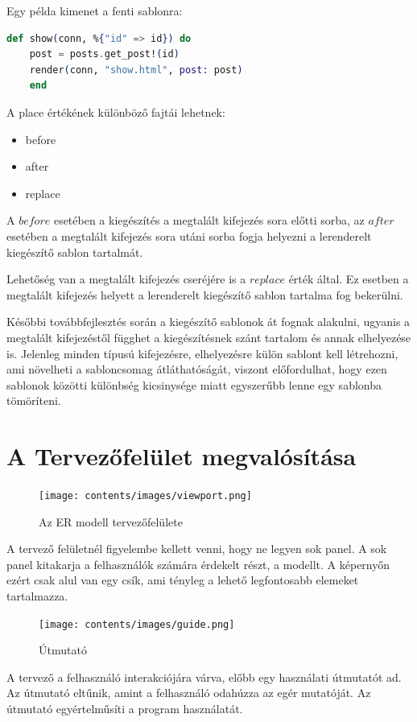 \documentclass[a4paper,12pt,oneside]{report}
\begin{document}
\begin{justify}
	Egy példa kimenet a fenti sablonra: 

	\begin{lstlisting}[language=elixir]
	def show(conn, %{"id" => id}) do
	post = posts.get_post!(id)
	render(conn, "show.html", post: post)
	end
	\end{lstlisting}

	A place értékének különböző fajtái lehetnek: 

	\begin{itemize}
		\item before
		\item after
		\item replace
	\end{itemize}

	A $before$ esetében a kiegészítés a megtalált kifejezés sora előtti sorba, az $after$ esetében a megtalált kifejezés sora utáni sorba fogja helyezni a lerenderelt kiegészítő sablon tartalmát.

	Lehetőség van a megtalált kifejezés cseréjére is a $replace$ érték által. Ez esetben a megtalált kifejezés helyett a lerenderelt kiegészítő sablon tartalma fog bekerülni.

	Későbbi továbbfejlesztés során a kiegészítő sablonok át fognak alakulni, ugyanis a megtalált kifejezéstől függhet a kiegészítésnek szánt tartalom és annak elhelyezése is. Jelenleg minden típusú kifejezésre, elhelyezésre külön sablont kell létrehozni, ami növelheti a sabloncsomag átláthatóságát, viszont előfordulhat, hogy ezen sablonok közötti különbség kicsinysége miatt egyszerűbb lenne egy sablonba tömöríteni.

\end{justify}

\newpage
\section{A Tervezőfelület megvalósítása}

\begin{justify}
	\begin{figure}[H]
		\texttt{[image: contents/images/viewport.png]}
		\caption{Az ER modell tervezőfelülete}
		\label{fig:viewport}
	\end{figure}

	A tervező felületnél figyelembe kellett venni, hogy ne legyen sok panel. A sok panel kitakarja a felhasználók számára érdekelt részt, a modellt. A képernyőn ezért csak alul van egy csík, ami tényleg a lehető legfontosabb elemeket tartalmazza.


	\begin{figure}[H]
		\texttt{[image: contents/images/guide.png]}
		\caption{Útmutató}
		\label{fig:guide}
	\end{figure}

	A tervező a felhasználó interakciójára várva, előbb egy használati útmutatót ad. Az útmutató eltűnik, amint a felhasználó odahúzza az egér mutatóját. Az útmutató egyértelműsíti a program használatát. 
\end{justify}
\end{document}
